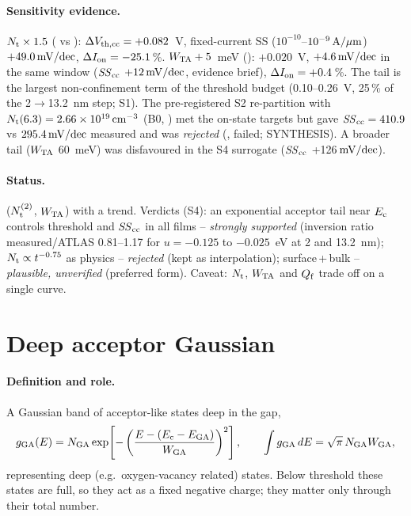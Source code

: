 \paragraph{Sensitivity evidence.}
$N_{\mathrm{t}}\times1.5$ ( vs ): $\Delta V_{\mathrm{th,cc}} = +0.082$~V, fixed-current SS ($10^{-10}$--$10^{-9}\,\mathrm{A}/\mu\mathrm{m}$)
$+49.0\,\mathrm{mV/dec}$, $\Delta I_{\mathrm{on}} = -25.1$\,\%. $W_{\mathrm{TA}} + 5$~meV (): $+0.020$~V, $+4.6\,\mathrm{mV/dec}$ in the same window
($\mathit{SS}_{\mathrm{cc}}$ $+12\,\mathrm{mV/dec}$, evidence brief), $\Delta I_{\mathrm{on}} = +0.4$\,\%. The tail is the largest non-confinement term of the
threshold budget (0.10--0.26~V, 25\,\% of the 2$\rightarrow$13.2~nm step; S1). The pre-registered S2
re-partition with $N_{\mathrm{t}}(6.3) = 2.66\times10^{19}\,\mathrm{cm}^{-3}$ (B0, ) met the on-state targets but gave
$\mathit{SS}_{\mathrm{cc}} = 410.9$ vs $295.4\,\mathrm{mV/dec}$ measured and was \emph{rejected} (\evOOS, failed; SYNTHESIS). A broader tail
($W_{\mathrm{TA}}$ 60~meV) was disfavoured in the S4 surrogate ($\mathit{SS}_{\mathrm{cc}}$ +126$\,\mathrm{mV/dec}$).

\paragraph{Status.}
 ($N_{\mathrm{t}}^{(2)}$, $W_{\mathrm{TA}}$) with a  trend. Verdicts (S4): an exponential acceptor tail
near $E_{\mathrm{c}}$ controls threshold and $\mathit{SS}_{\mathrm{cc}}$ in all films -- \emph{strongly supported} (inversion ratio
measured/ATLAS 0.81--1.17 for $u = -0.125$ to $-0.025$~eV at 2 and 13.2~nm); $N_{\mathrm{t}}\propto t^{-0.75}$ as physics --
\emph{rejected} (kept as interpolation); surface\,+\,bulk -- \emph{plausible, unverified} (preferred form).
Caveat: $N_{\mathrm{t}}$, $W_{\mathrm{TA}}$ and $Q_{\mathrm{f}}$ trade off on a single curve.

\section{Deep acceptor Gaussian}
\label{sec:par-deep}

\paragraph{Definition and role.}
A Gaussian band of acceptor-like states deep in the gap,
\begin{equation}
  g_{\mathrm{GA}}(E) = N_{\mathrm{GA}}\exp\!\left[-\left(\frac{E - (E_{\mathrm{c}}-E_{\mathrm{GA}})}{W_{\mathrm{GA}}}\right)^{2}\right],\qquad
  \int g_{\mathrm{GA}}\,dE = \sqrt{\pi}\,N_{\mathrm{GA}}W_{\mathrm{GA}},
  \label{eq:d1-gauss}
\end{equation}
representing deep (e.g.\ oxygen-vacancy related) states. Below threshold these states are full, so they act as
a fixed negative charge; they matter only through their total number.

